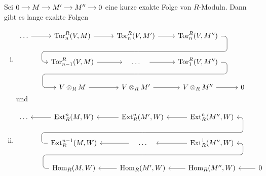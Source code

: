 \begin{satz}[{name=[{lange exakte Sequenzen für Tor und Ext}]}]
	Sei 
	\(
		\begin{tikzcd}[cramped,sep=small]
			0 \rar & M \rar & M' \rar & M'' \rar & 0
		\end{tikzcd}
	\)
	eine kurze exakte Folge von $R$-Moduln.
	Dann gibt es lange exakte Folgen 
	\begin{enumerate}[(i),itemsep=1em]
		\item \hspace{1.2cm}\(
			\begin{tikzcd}
				\ldots \rar & \Tor^R_n(V,M) \rar & \Tor^R_n(V,M') \rar \ar[d,phantom,""{coordinate, name=Z}] & \Tor_n^R(V,M'') \ar[dll,rounded corners,to path={
																		-- ([xshift=2ex]\tikztostart.east)
																		|- (Z) [near end]\tikztonodes
																		-| ([xshift=-2ex]\tikztotarget.west)
																		-- (\tikztotarget)
																		}] & \\
				&\Tor^R_{n-1}(V,M) \rar & \minwidthbox{\ldots}{3em} \rar \ar[d,phantom,""{coordinate, name=Y}]& \Tor_1^R(V,M'') \ar[dll,rounded corners,to path={
																		-- ([xshift=2ex]\tikztostart.east)
																		|- (Y) [near end]\tikztonodes
																		-| ([xshift=-4.4ex]\tikztotarget.west)
																		-- (\tikztotarget)
																		}] \\
				&V \otimes_R M \rar & V \otimes_R M' \rar & V \otimes_R M'' \rar & 0 
			\end{tikzcd}
		\) \\[1em]
		und
		\item \hspace{1cm}\(
			\begin{tikzcd}
				\ldots & \Ext_R^n(M,W) \lar & \Ext^n_R(M',W) \ar[d,phantom,""{coordinate, name=Z}]\lar & \Ext_R^n(M'',W) \lar \\
				&\Ext_R^{n-1}(M,W) \ar[urr,rounded corners,to path={
								-- ([xshift=-2ex]\tikztostart.west)
								|- (Z) [near end]\tikztonodes
								-| ([xshift=2ex]\tikztotarget.east)
								-- (\tikztotarget)
								}] 
				& \lar \minwidthbox{\ldots}{3em} \ar[d,phantom,""{coordinate, name=Y}] & \Ext_R^1(M'',W) \lar \\
				&\Hom_R(M,W) \ar[urr,rounded corners,to path={
								-- ([xshift=-2ex]\tikztostart.west)
								|- (Y) [near end]\tikztonodes
								-| ([xshift=2ex]\tikztotarget.east)
								-- (\tikztotarget)
								}] & \Hom_R(M',W) \lar & \Hom_R(M'',W) \lar & 0 \lar
			\end{tikzcd}
		\)
	\end{enumerate}
\end{satz}
